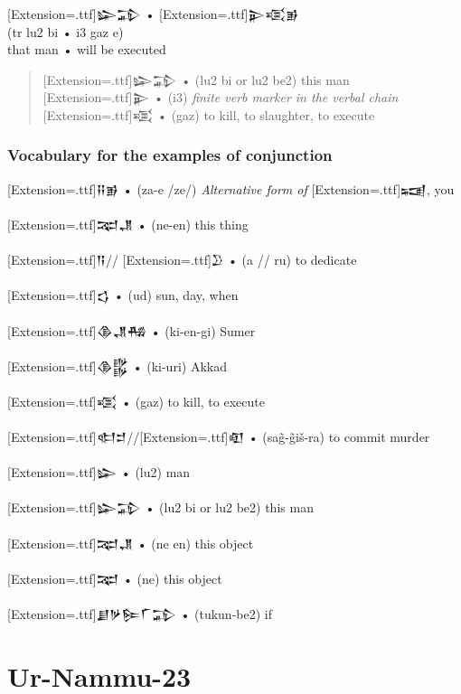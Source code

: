 \documentclass[a4paper,12pt]{book}
\newcommand{\fcn}{\setmainfont{Akkadian}[Extension=.ttf]}
\newcommand{\fcm}{\large\setmainfont{Akkadian}[Extension=.ttf]}
\begin{document}
\newpage
\noindent
{\fcm 𒇽𒁉} • {\fcm 𒉌𒄤𒂊}\\
(tr lu2 bi • i3 gaz e)\\
that man • will be executed\\
\begin{quote}
{\fcm 𒇽𒁉} • (lu2 bi or lu2 be2) this man\\
{\fcm 𒉌} • (i3) {\em finite verb marker in the verbal chain}\\
{\fcm 𒄤} • (gaz) to kill, to slaughter, to execute
\end{quote}

\subsection*{Vocabulary for the examples of conjunction}
\noindent
{\fcm 𒍝𒂊} • (za-e /ze/) {\em Alternative form of} {\fcn 𒍢}, you\\
\verb||\\    
{\fcm 𒉈𒂗} • (ne-en) this thing\\
\verb||\\
{\fcm 𒀀}// {\fcm 𒊒} • (a // ru) to dedicate\\
\verb||\\
{\fcm 𒌓} • (ud) sun, day, when\\
\verb||\\
{\fcm 𒆠𒂗𒄀} • (ki-en-gi) Sumer\\
\verb||\\
{\fcm 𒆠𒌵} • (ki-uri) Akkad\\
\verb||\\
{\fcm 𒄤} • (gaz) to kill, to execute\\
\verb||\\
{\fcm 𒊕𒄑}//{\fcm 𒊏} • (sag̃-g̃iš-ra) to commit murder\\
\verb||\\
{\fcm 𒇽} • (lu2) man\\
\verb||\\
{\fcm 𒇽𒁉} • (lu2 bi or lu2 be2) this man\\
\verb||\\
{\fcm 𒉈𒂗} • (ne en) this object\\
\verb||\\
{\fcm 𒉈} • (ne) this object\\
\verb||\\
{\fcm 𒋗𒃻𒌉𒇲𒁉} • (tukun-be2) if\\

\chapter{Ur-Nammu-23}
\end{document}
